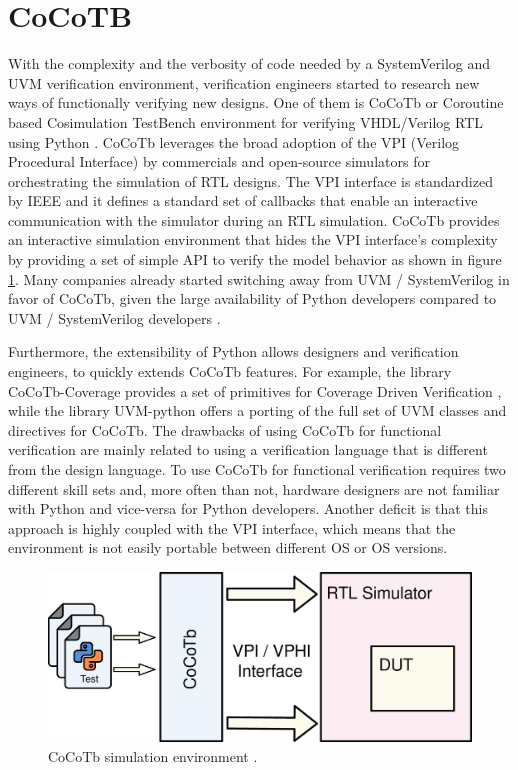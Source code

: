 \section{CoCoTB}
With the complexity and the verbosity of code needed by a SystemVerilog and UVM
verification environment, verification engineers started to research new ways of
functionally verifying new designs. One of them is CoCoTb or Coroutine based
Cosimulation TestBench environment for verifying VHDL/Verilog RTL using Python
\cite{online:cocotbpresentation}. CoCoTb leverages the broad adoption of the VPI
(Verilog Procedural Interface) by commercials and open-source simulators for
orchestrating the simulation of RTL designs. The VPI interface is standardized
by IEEE \cite{496013} and it defines a standard set of callbacks that enable an
interactive communication with the simulator during an RTL simulation. CoCoTb
provides an interactive simulation environment that hides the VPI interface's
complexity by providing a set of simple API to verify the model behavior as
shown in figure \ref{fig:cocotbsimenviron}. Many companies already started
switching away from UVM / SystemVerilog in favor of CoCoTb, given the large
availability of Python developers compared to UVM / SystemVerilog developers
\cite{online:cocotbpresentation}.

Furthermore, the extensibility of Python allows designers and verification
engineers, to quickly extends CoCoTb features. For example, the library
CoCoTb-Coverage provides a set of primitives for Coverage Driven Verification
\cite{cieplucha2016new}, while the library UVM-python \cite{online:uvmpython}
offers a porting of the full set of UVM classes and directives for CoCoTb. The
drawbacks of using CoCoTb for functional verification are mainly related to
using a verification language that is different from the design language. To use
CoCoTb for functional verification requires two different skill sets and, more
often than not, hardware designers are not familiar with Python and vice-versa
for Python developers. Another deficit is that this approach is highly coupled
with the VPI interface, which means that the environment is not easily portable
between different OS or OS versions.


\begin{figure}[htbp]
\centering
\includegraphics[width=0.6\linewidth]{pictures/CoCoTb_structure.eps}
\caption{CoCoTb simulation environment \cite{presentation:cerncocotb}.}
\label{fig:cocotbsimenviron}
\end{figure}
